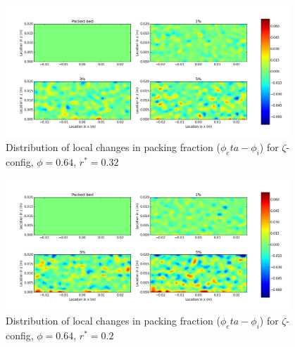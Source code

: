 \begin{figure}[!t]
    \centering
    \includegraphics[width = 0.95\textwidth]{figures/z-62-r23-1-deltas.png}
    \caption{Distribution of local changes in packing fraction ($\phi_eta - \phi_i$) for $\zeta$-config, $\phi = 0.64$, $r^* = 0.32$}\label{fig:z-624-r23-deltas}
\end{figure}

\begin{figure}[!t]
    \centering
    \includegraphics[width = 0.95\textwidth]{figures/z-62-r125-1-deltas.png}
    \caption{Distribution of local changes in packing fraction ($\phi_eta - \phi_i$) for $\zeta$-config, $\phi = 0.64$, $r^* = 0.2$}\label{fig:z-624-r125-deltas}
\end{figure}


\FloatBarrier


